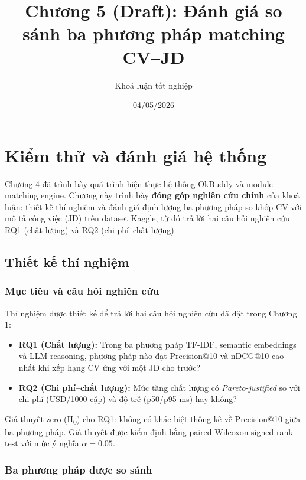 \documentclass[a4paper,13pt]{report}
\title{Chương 5 (Draft): Đánh giá so sánh ba phương pháp matching CV--JD}
\author{Khoá luận tốt nghiệp}
\date{04/05/2026}
\begin{document}
\maketitle

\chapter{Kiểm thử và đánh giá hệ thống}


Chương 4 đã trình bày quá trình hiện thực hệ thống OkBuddy và module matching engine. Chương này trình bày \textbf{đóng góp nghiên cứu chính} của khoá luận: thiết kế thí nghiệm và đánh giá định lượng ba phương pháp so khớp CV với mô tả công việc (JD) trên dataset Kaggle, từ đó trả lời hai câu hỏi nghiên cứu RQ1 (chất lượng) và RQ2 (chi phí--chất lượng).

\section{Thiết kế thí nghiệm}
\label{sec:exp_design}

\subsection{Mục tiêu và câu hỏi nghiên cứu}

Thí nghiệm được thiết kế để trả lời hai câu hỏi nghiên cứu đã đặt trong Chương 1:

\begin{itemize}
    \item \textbf{RQ1 (Chất lượng):} Trong ba phương pháp TF-IDF, semantic embeddings và LLM reasoning, phương pháp nào đạt Precision@10 và nDCG@10 cao nhất khi xếp hạng CV ứng với một JD cho trước?
    \item \textbf{RQ2 (Chi phí--chất lượng):} Mức tăng chất lượng có \textit{Pareto-justified} so với chi phí (USD/1000 cặp) và độ trễ (p50/p95 ms) hay không?
\end{itemize}

Giả thuyết zero (H\textsubscript{0}) cho RQ1: không có khác biệt thống kê về Precision@10 giữa ba phương pháp. Giả thuyết được kiểm định bằng paired Wilcoxon signed-rank test với mức ý nghĩa $\alpha = 0.05$.

\subsection{Ba phương pháp được so sánh}
\end{document}
